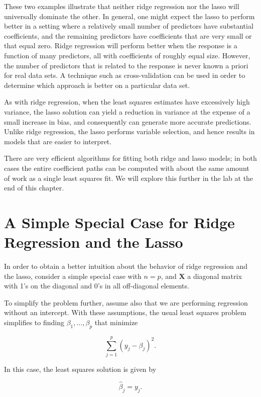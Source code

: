 \documentclass[10pt]{article}
\begin{document}
These two examples illustrate that neither ridge regression nor the lasso will universally dominate the other. In general, one might expect the lasso to perform better in a setting where a relatively small number of predictors have substantial coefficients, and the remaining predictors have coefficients that are very small or that equal zero. Ridge regression will perform better when the response is a function of many predictors, all with coefficients of roughly equal size. However, the number of predictors that is related to the response is never known a priori for real data sets. A technique such as cross-validation can be used in order to determine which approach is better on a particular data set.

As with ridge regression, when the least squares estimates have excessively high variance, the lasso solution can yield a reduction in variance at the expense of a small increase in bias, and consequently can generate more accurate predictions. Unlike ridge regression, the lasso performs variable selection, and hence results in models that are easier to interpret.

There are very efficient algorithms for fitting both ridge and lasso models; in both cases the entire coefficient paths can be computed with about the same amount of work as a single least squares fit. We will explore this further in the lab at the end of this chapter.

\section*{A Simple Special Case for Ridge Regression and the Lasso}
In order to obtain a better intuition about the behavior of ridge regression and the lasso, consider a simple special case with $n=p$, and $\mathbf{X}$ a diagonal matrix with 1's on the diagonal and 0's in all off-diagonal elements.

To simplify the problem further, assume also that we are performing regression without an intercept. With these assumptions, the usual least squares problem simplifies to finding $\beta_{1}, \ldots, \beta_{p}$ that minimize


\begin{equation*}
\sum_{j=1}^{p}\left(y_{j}-\beta_{j}\right)^{2} . \tag{6.11}
\end{equation*}


In this case, the least squares solution is given by

$$
\hat{\beta}_{j}=y_{j} .
$$
\end{document}
